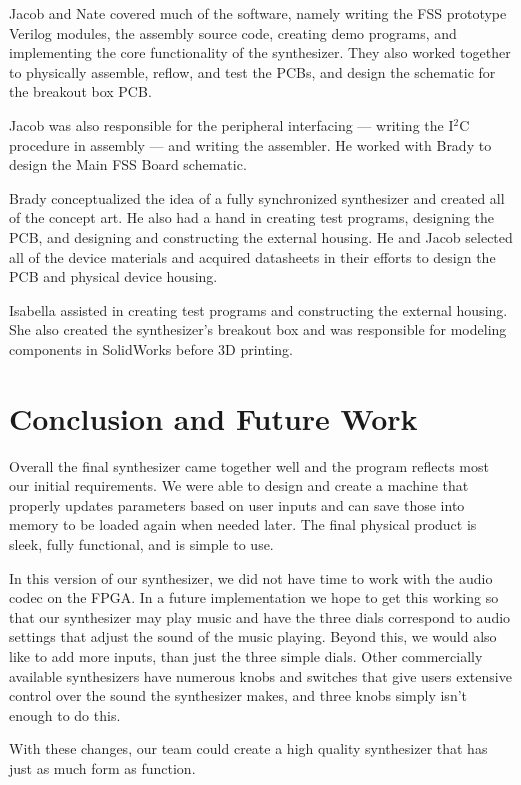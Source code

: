 \documentclass[conference]{IEEEtran}
\begin{document}
Jacob and Nate covered much of the software, namely writing the FSS prototype Verilog modules, the  assembly source code, creating demo programs, and implementing the core functionality of the synthesizer. They also worked together to physically assemble, reflow, and test the PCBs, and design the schematic for the breakout box PCB.

Jacob was also responsible for the peripheral interfacing --- writing the I$^2$C procedure in assembly --- and writing the assembler. He worked with Brady to design the Main FSS Board schematic.

Brady conceptualized the idea of a fully synchronized synthesizer and created all of the concept art. He also had a hand in creating test programs, designing the PCB, and designing and constructing the external housing. He and Jacob selected all of the device materials and acquired datasheets in their efforts to design the PCB and physical device housing.

Isabella assisted in creating test programs and constructing the external housing. She also created the synthesizer's breakout box and was responsible for modeling components in SolidWorks before 3D printing.

\section{Conclusion and Future Work}
Overall the final synthesizer came together well and the program reflects most our initial requirements. We were able to design and create a machine that properly updates parameters based on user inputs and can save those into memory to be loaded again when needed later. The final physical product is sleek, fully functional, and is simple to use.

In this version of our synthesizer, we did not have time to work with the audio codec on the FPGA. In a future implementation we hope to get this working so that our synthesizer may play music and have the three dials correspond to audio settings that adjust the sound of the music playing. Beyond this, we would also like to add more inputs, than just the three simple dials. Other commercially available synthesizers have numerous knobs and switches that give users extensive control over the sound the synthesizer makes, and three knobs simply isn't enough to do this.

With these changes, our team could create a high quality synthesizer that has just as much form as function.
\end{document}
